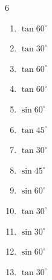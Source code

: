 \begin{multicols}{6}
\begin{enumerate}
  \item $\displaystyle \tan{60^\circ}$


  \item $\displaystyle \tan{30^\circ}$


  \item $\displaystyle \tan{60^\circ}$


  \item $\displaystyle \tan{60^\circ}$


  \item $\displaystyle \sin{60^\circ}$


  \item $\displaystyle \tan{45^\circ}$

        \phantom{$\displaystyle =1$}

  \item $\displaystyle \tan{30^\circ}$


\columnbreak %

  \item $\displaystyle \sin{45^\circ}$


  \item $\displaystyle \sin{60^\circ}$


  \item $\displaystyle \tan{30^\circ}$


  \item $\displaystyle \sin{30^\circ}$


  \item $\displaystyle \sin{60^\circ}$


  \item $\displaystyle \tan{30^\circ}$


\end{enumerate}
\end{multicols}
